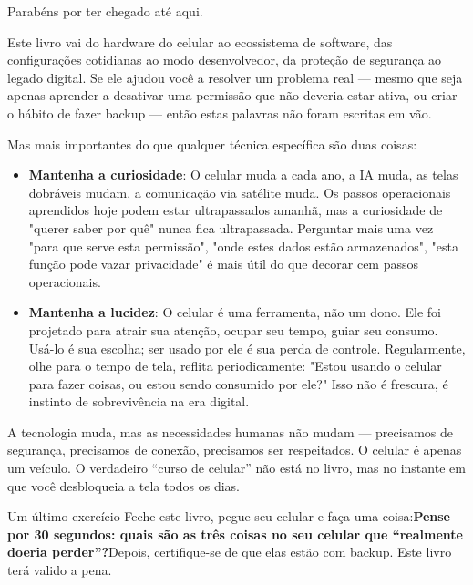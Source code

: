 
Parabéns por ter chegado até aqui.

Este livro vai do hardware do celular ao ecossistema de software, das configurações cotidianas ao modo desenvolvedor, da proteção de segurança ao legado digital. Se ele ajudou você a resolver um problema real — mesmo que seja apenas aprender a desativar uma permissão que não deveria estar ativa, ou criar o hábito de fazer backup — então estas palavras não foram escritas em vão.

Mas mais importantes do que qualquer técnica específica são duas coisas:

\begin{itemize}
  \item \textbf{Mantenha a curiosidade}: O celular muda a cada ano, a IA muda, as telas dobráveis mudam, a comunicação via satélite muda. Os passos operacionais aprendidos hoje podem estar ultrapassados amanhã, mas a curiosidade de "querer saber por quê" nunca fica ultrapassada. Perguntar mais uma vez "para que serve esta permissão", "onde estes dados estão armazenados", "esta função pode vazar privacidade" é mais útil do que decorar cem passos operacionais.
  \item \textbf{Mantenha a lucidez}: O celular é uma ferramenta, não um dono. Ele foi projetado para atrair sua atenção, ocupar seu tempo, guiar seu consumo. Usá-lo é sua escolha; ser usado por ele é sua perda de controle. Regularmente, olhe para o tempo de tela, reflita periodicamente: "Estou usando o celular para fazer coisas, ou estou sendo consumido por ele?" Isso não é frescura, é instinto de sobrevivência na era digital.
\end{itemize}

A tecnologia muda, mas as necessidades humanas não mudam — precisamos de segurança, precisamos de conexão, precisamos ser respeitados. O celular é apenas um veículo. O verdadeiro “curso de celular” não está no livro, mas no instante em que você desbloqueia a tela todos os dias.

\begin{tcbpractice}{Um último exercício}
Feche este livro, pegue seu celular e faça uma coisa:\textbf{Pense por 30 segundos: quais são as três coisas no seu celular que “realmente doeria perder”?}Depois, certifique-se de que elas estão com backup. Este livro terá valido a pena.

\end{tcbpractice}
